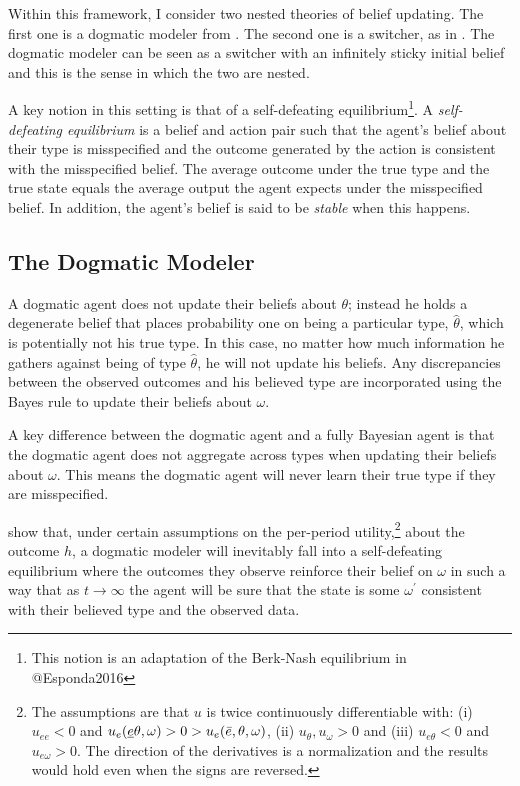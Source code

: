 \documentclass[
  12pt,
]{article}
\begin{document}
Within this framework, I consider two nested theories of belief
updating. The first one is a dogmatic modeler from \citet{Heidhues2018}.
The second one is a switcher, as in \citet{Ba2023}. The dogmatic modeler
can be seen as a switcher with an infinitely sticky initial belief and
this is the sense in which the two are nested.

A key notion in this setting is that of a self-defeating
equilibrium\footnote{This notion is an adaptation of the Berk-Nash equilibrium in 
@Esponda2016}. A \emph{self-defeating equilibrium} is a belief and
action pair such that the agent's belief about their type is
misspecified and the outcome generated by the action is consistent with
the misspecified belief. The average outcome under the true type and the
true state equals the average output the agent expects under the
misspecified belief. In addition, the agent's belief is said to be
\emph{stable} when this happens.

\hypertarget{the-dogmatic-modeler}{%
\subsection{The Dogmatic Modeler}\label{the-dogmatic-modeler}}

A dogmatic agent does not update their beliefs about \(\theta\); instead
he holds a degenerate belief that places probability one on being a
particular type, \(\hat{\theta}\), which is potentially not his true
type. In this case, no matter how much information he gathers against
being of type \(\hat{\theta}\), he will not update his beliefs. Any
discrepancies between the observed outcomes and his believed type are
incorporated using the Bayes rule to update their beliefs about
\(\omega\).

A key difference between the dogmatic agent and a fully Bayesian agent
is that the dogmatic agent does not aggregate across types when updating
their beliefs about \(\omega\). This means the dogmatic agent will never
learn their true type if they are misspecified.

\citet{Heidhues2018} show that, under certain assumptions on the
per-period utility,\footnote{The assumptions are that 
$u$ is twice continuously differentiable with: (i)$u_{ee}<0$ and $u_e(\underline{e} \theta, \omega)>0>u_e(\Bar{e}, \theta, \omega)$, 
(ii) $u_{\theta}, u_{\omega}>0$ and (iii) $u_{e\theta}<0$ and $u_{e\omega}>0$. The direction of the derivatives is a normalization
and the results would hold even when the signs are reversed.} about the
outcome \(h\), a dogmatic modeler will inevitably fall into a
self-defeating equilibrium where the outcomes they observe reinforce
their belief on \(\omega\) in such a way that as \(t\to\infty\) the
agent will be sure that the state is some \(\omega^{'}\) consistent with
their believed type and the observed data.
\end{document}
